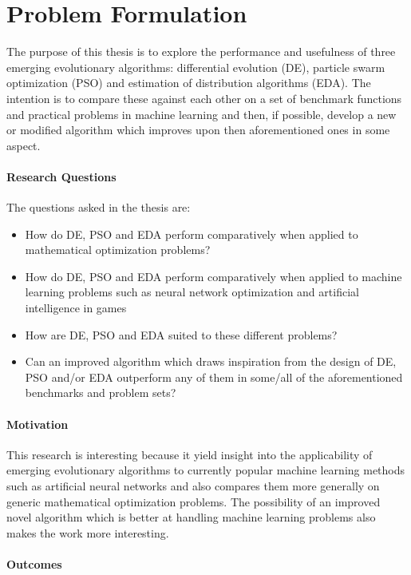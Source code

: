 \section{Problem Formulation}

The purpose of this thesis is to explore the performance and usefulness of three emerging evolutionary algorithms: differential evolution (DE), particle swarm optimization (PSO) and estimation of distribution algorithms (EDA). The intention is to compare these against each other on a set of benchmark functions and practical problems in machine learning and then, if possible, develop a new or modified algorithm which improves upon then aforementioned ones in some aspect.

\paragraph{Research Questions}

The questions asked in the thesis are:
\begin{itemize}
  \item How do DE, PSO and EDA perform comparatively when applied to mathematical optimization problems?
  \item How do DE, PSO and EDA perform comparatively when applied to machine learning problems such as neural network optimization and artificial intelligence in games
  \item How are DE, PSO and EDA suited to these different problems?
  \item Can an improved algorithm which draws inspiration from the design of DE, PSO and/or EDA outperform any of them in some/all of the aforementioned benchmarks and problem sets?
\end{itemize}

\paragraph{Motivation}

This research is interesting because it yield insight into the applicability of emerging evolutionary algorithms to currently popular machine learning methods such as artificial neural networks and also compares them more generally on generic mathematical optimization problems. The possibility of an improved novel algorithm which is better at handling machine learning problems also makes the work more interesting.

\paragraph{Outcomes}

